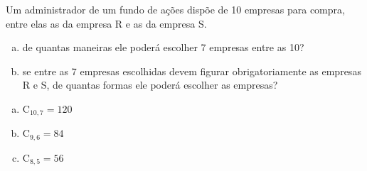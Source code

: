 \begin{ex}
Um administrador de um fundo de ações dispõe de 10 empresas para compra, entre elas as da empresa R e as da empresa S.
   \begin{enumerate}[(a)]
   \item de quantas maneiras ele poderá escolher 7 empresas entre as 10?
   \item se entre as 7 empresas escolhidas devem figurar obrigatoriamente as empresas R e S, de quantas formas ele poderá escolher as empresas?
   \end{enumerate}
     \begin{sol}
       \phantom{A}
          \begin{enumerate} [(a)]
              \item $\mathrm{C}_{{10},7}=120$
              \item $\mathrm{C}_{9,6}=84$
              \item $\mathrm{C}_{8,5}=56$
          \end{enumerate}
     \end{sol}
\end{ex}